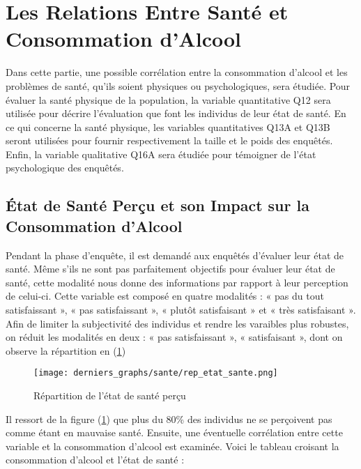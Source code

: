 \documentclass{article}
\begin{document}
\newpage

\section{Les Relations Entre Santé et Consommation d'Alcool}
Dans cette partie, une possible corrélation entre la consommation d'alcool et les problèmes de santé, qu'ils soient physiques ou psychologiques, sera étudiée. Pour évaluer la santé physique de la population, la variable quantitative Q12 sera utilisée pour décrire l'évaluation que font les individus de leur état de santé. En ce qui concerne la santé physique, les variables quantitatives Q13A et Q13B seront utilisées pour fournir respectivement la taille et le poids des enquêtés. Enfin, la variable qualitative Q16A sera étudiée pour témoigner de l'état psychologique des enquêtés.
\subsection{État de Santé Perçu et son Impact sur la Consommation d'Alcool}
Pendant la phase d’enquête, il est demandé aux enquêtés d'évaluer leur état de santé. Même s'ils ne sont pas parfaitement objectifs pour évaluer leur état de santé, cette modalité nous donne des informations par rapport à leur perception de celui-ci. Cette variable est composé en quatre modalités : « pas du tout satisfaissant », « pas satisfaissant », « plutôt satisfaisant » et « très satisfaisant ». Afin de limiter la subjectivité des individus et rendre les varaibles plus robustes, on réduit les modalités en deux :   « pas satisfaissant », « satisfaisant », dont on observe la répartition en (\ref{fig:santefig4})

\begin{figure}[H]
  \centering
  \texttt{[image: derniers\_graphs/sante/rep\_etat\_sante.png]} 
  \caption{Répartition de l'état de santé perçu}
  \label{fig:santefig4}
\end{figure}

Il ressort de la figure (\ref{fig:santefig4}) que plus du 80\% des individus ne se perçoivent pas comme étant en mauvaise santé. Ensuite, une éventuelle corrélation entre cette variable et la consommation d'alcool est examinée. Voici le tableau croisant la consommation d'alcool et l'état de santé :
\end{document}
